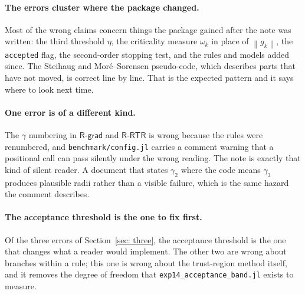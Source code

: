 \documentclass[11pt,a4paper]{article}
\providecommand{\norm}[1]{\left \lVert #1 \right \rVert}
\providecommand{\Rgrad}{\textsf{R-grad}}
\providecommand{\Rrtr}{\textsf{R-RTR}}
\begin{document}
\paragraph{The errors cluster where the package changed.}
Most of the wrong claims concern things the package gained after the note was
written: the third threshold $\eta$, the criticality measure $\omega_k$ in
place of $\norm{g_k}$, the \texttt{accepted} flag, the second-order stopping
test, and the rules and models added since. The Steihaug and Mor\'e--Sorensen
pseudo-code, which describes parts that have not moved, is correct line by line.
That is the expected pattern and it says where to look next time.

\paragraph{One error is of a different kind.}
The $\gamma$ numbering in $\Rgrad$ and $\Rrtr$ is wrong because the rules were
renumbered, and \texttt{benchmark/config.jl} carries a comment warning that a
positional call can pass silently under the wrong reading. The note is exactly
that kind of silent reader. A document that states $\gamma_2$ where the code
means $\gamma_3$ produces plausible radii rather than a visible failure, which is
the same hazard the comment describes.

\paragraph{The acceptance threshold is the one to fix first.}
Of the three errors of Section~\ref{sec: three}, the acceptance threshold is the
one that changes what a reader would implement. The other two are wrong about
branches within a rule; this one is wrong about the trust-region method itself,
and it removes the degree of freedom that \texttt{exp14\_acceptance\_band.jl}
exists to measure.
\end{document}
